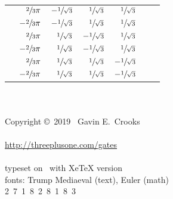 \documentclass[article,pagebackref]{bespoke5}
\begin{document}
\begin{table}[htp]
\begin{center}
\begin{tabular}{crrrrcc}
						& $\sfrac{2}{3}\pi$		& $-\sfrac{1}{\sqrt{3}}$ & $\sfrac{1}{\sqrt{3}}$ & $\sfrac{1}{\sqrt{3}}$ & \\
						& $-\sfrac{2}{3}\pi$	& $-\sfrac{1}{\sqrt{3}}$ & $\sfrac{1}{\sqrt{3}}$ & $\sfrac{1}{\sqrt{3}}$ & \\

						& $\sfrac{2}{3}\pi$		& $\sfrac{1}{\sqrt{3}}$ & $-\sfrac{1}{\sqrt{3}}$ & $\sfrac{1}{\sqrt{3}}$ & \\
						& $-\sfrac{2}{3}\pi$	& $\sfrac{1}{\sqrt{3}}$ & $-\sfrac{1}{\sqrt{3}}$ & $\sfrac{1}{\sqrt{3}}$ & \\

						& $\sfrac{2}{3}\pi$		& $\sfrac{1}{\sqrt{3}}$ & $\sfrac{1}{\sqrt{3}}$ & $-\sfrac{1}{\sqrt{3}}$ & \\
						& $-\sfrac{2}{3}\pi$	& $\sfrac{1}{\sqrt{3}}$ & $\sfrac{1}{\sqrt{3}}$ & $-\sfrac{1}{\sqrt{3}}$ &
\end{tabular}
\end{center}
\label{default}
\end{table}%


\appendix













\vfill
{\center
~\\~\\
Copyright \copyright~2019~ Gavin E.\ Crooks~\\
~ %
\\
\url{http://threeplusone.com/gates} 
\\
~
\\
typeset on \isotoday~with XeTeX version \the\XeTeXversion\XeTeXrevision
\\
fonts: Trump Mediaeval (text), Euler (math)
\\
2~7~1~8~2~8~1~8~3
\\
~ 
\\
}

\end{document}

